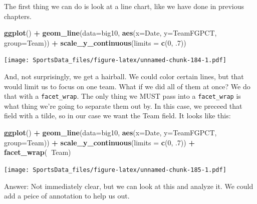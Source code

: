 \documentclass[]{book}
\newenvironment{Shaded}{\begin{snugshade}}{\end{snugshade}}
\newcommand{\KeywordTok}[1]{\textcolor[rgb]{0.13,0.29,0.53}{\textbf{#1}}}
\newcommand{\DataTypeTok}[1]{\textcolor[rgb]{0.13,0.29,0.53}{#1}}
\newcommand{\DecValTok}[1]{\textcolor[rgb]{0.00,0.00,0.81}{#1}}
\newcommand{\StringTok}[1]{\textcolor[rgb]{0.31,0.60,0.02}{#1}}
\newcommand{\OperatorTok}[1]{\textcolor[rgb]{0.81,0.36,0.00}{\textbf{#1}}}
\newcommand{\NormalTok}[1]{#1}
\begin{document}
The first thing we can do is look at a line chart, like we have done in
previous chapters.

\begin{Shaded}
\begin{Highlighting}[]
\KeywordTok{ggplot}\NormalTok{() }\OperatorTok{+}\StringTok{ }\KeywordTok{geom_line}\NormalTok{(}\DataTypeTok{data=}\NormalTok{big10, }\KeywordTok{aes}\NormalTok{(}\DataTypeTok{x=}\NormalTok{Date, }\DataTypeTok{y=}\NormalTok{TeamFGPCT, }\DataTypeTok{group=}\NormalTok{Team)) }\OperatorTok{+}\StringTok{ }\KeywordTok{scale_y_continuous}\NormalTok{(}\DataTypeTok{limits =} \KeywordTok{c}\NormalTok{(}\DecValTok{0}\NormalTok{, .}\DecValTok{7}\NormalTok{))}
\end{Highlighting}
\end{Shaded}

\texttt{[image: SportsData\_files/figure-latex/unnamed-chunk-184-1.pdf]}

And, not surprisingly, we get a hairball. We could color certain lines,
but that would limit us to focus on one team. What if we did all of them
at once? We do that with a \texttt{facet\_wrap}. The only thing we MUST
pass into a \texttt{facet\_wrap} is what thing we're going to separate
them out by. In this case, we preceed that field with a tilde, so in our
case we want the Team field. It looks like this:

\begin{Shaded}
\begin{Highlighting}[]
\KeywordTok{ggplot}\NormalTok{() }\OperatorTok{+}\StringTok{ }\KeywordTok{geom_line}\NormalTok{(}\DataTypeTok{data=}\NormalTok{big10, }\KeywordTok{aes}\NormalTok{(}\DataTypeTok{x=}\NormalTok{Date, }\DataTypeTok{y=}\NormalTok{TeamFGPCT, }\DataTypeTok{group=}\NormalTok{Team)) }\OperatorTok{+}\StringTok{ }\KeywordTok{scale_y_continuous}\NormalTok{(}\DataTypeTok{limits =} \KeywordTok{c}\NormalTok{(}\DecValTok{0}\NormalTok{, .}\DecValTok{7}\NormalTok{)) }\OperatorTok{+}\StringTok{ }\KeywordTok{facet_wrap}\NormalTok{(}\OperatorTok{~}\NormalTok{Team)}
\end{Highlighting}
\end{Shaded}

\texttt{[image: SportsData\_files/figure-latex/unnamed-chunk-185-1.pdf]}

Answer: Not immediately clear, but we can look at this and analyze it.
We could add a peice of annotation to help us out.

\begin{Shaded}
\end{Shaded}
\end{document}
